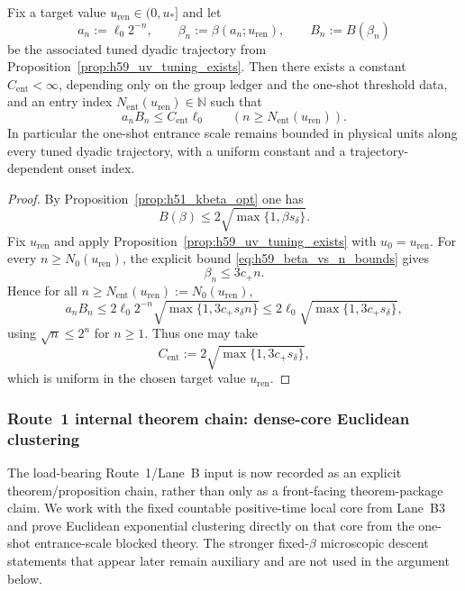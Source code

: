 \begin{corollary}\label{cor:route1_bounded_physical_entrance}
Fix a target value $u_{\mathrm{ren}}\in(0,u_\ast]$ and let
\[
a_n:=\ell_0 2^{-n},\qquad \beta_n:=\beta(a_n;u_{\mathrm{ren}}),\qquad B_n:=B(\beta_n)
\]
be the associated tuned dyadic trajectory from Proposition~\ref{prop:h59_uv_tuning_exists}.
Then there exists a constant $C_{\mathrm{ent}}<\infty$, depending only on the group ledger and the one-shot threshold data, and an entry index $N_{\mathrm{ent}}(u_{\mathrm{ren}})\in\mathbb N$ such that
\[
 a_n B_n\le C_{\mathrm{ent}}\ell_0
 \qquad (n\ge N_{\mathrm{ent}}(u_{\mathrm{ren}})).
\]
In particular the one-shot entrance scale remains bounded in physical units along every tuned dyadic trajectory, with a uniform constant and a trajectory-dependent onset index.
\end{corollary}

\begin{proof}
By Proposition~\ref{prop:h51_kbeta_opt} one has
\[
B(\beta)\le 2\sqrt{\max\{1,\beta s_{\delta}\}}.
\]
Fix $u_{\mathrm{ren}}$ and apply Proposition~\ref{prop:h59_uv_tuning_exists} with $u_0=u_{\mathrm{ren}}$.
For every $n\ge N_0(u_{\mathrm{ren}})$, the explicit bound \eqref{eq:h59_beta_vs_n_bounds} gives
\[
\beta_n\le 3c_+ n.
\]
Hence for all $n\ge N_{\mathrm{ent}}(u_{\mathrm{ren}}):=N_0(u_{\mathrm{ren}})$,
\[
 a_n B_n
 \le 2\ell_0 2^{-n}\sqrt{\max\{1,3c_+s_{\delta}n\}}
 \le 2\ell_0\sqrt{\max\{1,3c_+s_{\delta}\}},
\]
using $\sqrt n\le 2^n$ for $n\ge 1$.
Thus one may take
\[
C_{\mathrm{ent}}:=2\sqrt{\max\{1,3c_+s_{\delta}\}},
\]
which is uniform in the chosen target value $u_{\mathrm{ren}}$.
\end{proof}

\subsubsection{Route~1 internal theorem chain: dense-core Euclidean clustering}
\label{sec:route1_dense_core_internal}

The load-bearing Route~1/Lane~B input is now recorded as an explicit theorem/proposition chain, rather than only as a front-facing theorem-package claim.
We work with the fixed countable positive-time local core from Lane~B3 and prove Euclidean exponential clustering directly on that core from the one-shot entrance-scale blocked theory.
The stronger fixed-$\beta$ microscopic descent statements that appear later remain auxiliary and are not used in the argument below.

